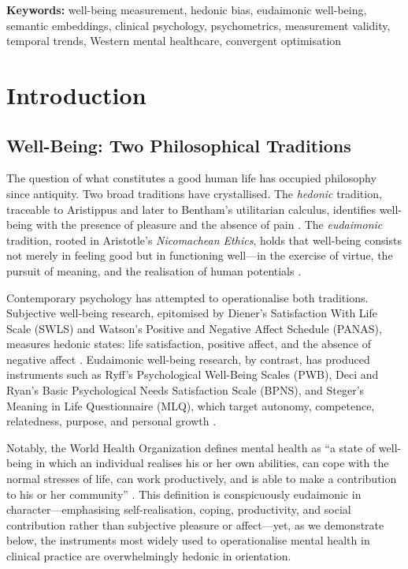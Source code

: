 \documentclass[12pt,a4paper]{article}
\begin{document}
\vspace{4pt}
\noindent\textbf{Keywords:} well-being measurement, hedonic bias, eudaimonic well-being, semantic embeddings, clinical psychology, psychometrics, measurement validity, temporal trends, Western mental healthcare, convergent optimisation

\newpage
\tableofcontents
\newpage

\section{Introduction}\label{sec:introduction}

\subsection{Well-Being: Two Philosophical Traditions}

The question of what constitutes a good human life has occupied philosophy since antiquity.
Two broad traditions have crystallised.
The \textit{hedonic} tradition, traceable to Aristippus and later to Bentham's utilitarian calculus, identifies well-being with the presence of pleasure and the absence of pain
\citep{kahneman1999hedonic, diener1984subjective}.
The \textit{eudaimonic} tradition, rooted in Aristotle's \textit{Nicomachean Ethics}, holds that well-being consists not merely in feeling good but in functioning well---in the exercise of virtue, the pursuit of meaning, and the realisation of human potentials
\citep{ryan2001happiness, waterman1993eudaimonia, aristotle1999nicomachean}.

Contemporary psychology has attempted to operationalise both traditions.
Subjective well-being research, epitomised by Diener's Satisfaction With Life Scale (SWLS)
and Watson's Positive and Negative Affect Schedule (PANAS), measures hedonic states:
life satisfaction, positive affect, and the absence of negative affect
\citep{diener1985satisfaction, watson1988panas}.
Eudaimonic well-being research, by contrast, has produced instruments such as Ryff's Psychological Well-Being Scales (PWB), Deci and Ryan's Basic Psychological Needs Satisfaction Scale (BPNS), and Steger's Meaning in Life Questionnaire (MLQ), which target autonomy, competence, relatedness, purpose, and personal growth
\citep{ryff1989happiness, deci2000self, steger2006meaning}.

Notably, the World Health Organization defines mental health as ``a state of well-being in which an individual realises his or her own abilities, can cope with the normal stresses of life, can work productively, and is able to make a contribution to his or her community'' \citep{who2004mental}.
This definition is conspicuously eudaimonic in character---emphasising self-realisation, coping, productivity, and social contribution rather than subjective pleasure or affect---yet, as we demonstrate below, the instruments most widely used to operationalise mental health in clinical practice are overwhelmingly hedonic in orientation.
\end{document}
